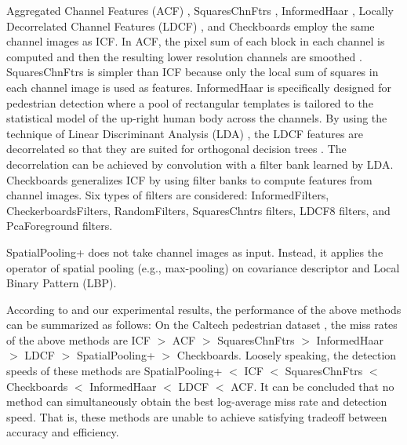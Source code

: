 \documentclass[10pt,twocolumn,letterpaper]{article}
\begin{document}
Aggregated Channel Features (ACF) \cite{Dollar_ACF_PAMI_2014}, SquaresChnFtrs \cite{Benenson_SquareChns_CVPR_2013}, InformedHaar \cite{Zhang_Info.Haar_CVPR_2014}, Locally Decorrelated 
Channel Features (LDCF) \cite{Nam_LDCF_NIPS_2014}, and Checkboards \cite{Zhang_FCF_CVPR_2015} employ the same channel images as ICF. In ACF, 
the pixel sum of each block in each channel is computed and then 
the resulting lower resolution channels are smoothed \cite{Dollar_ACF_PAMI_2014,Dollar_FastestWest_BMVC_2010}. SquaresChnFtrs \cite{Benenson_SquareChns_CVPR_2013} is simpler 
than ICF because only the local sum of squares in each channel image is used as 
features. InformedHaar \cite{Zhang_Info.Haar_CVPR_2014} is specifically 
designed for pedestrian detection where a pool of rectangular templates is 
tailored to the statistical model of the up-right human body across the 
channels. By using the technique of Linear Discriminant Analysis (LDA) \cite{Hariharan_DDCC_ECCV_2012}, the LDCF 
features are decorrelated so that they are suited for orthogonal decision 
trees \cite{Nam_LDCF_NIPS_2014}. The decorrelation can be achieved by convolution with a filter 
bank learned by LDA. Checkboards \cite{Zhang_FCF_CVPR_2015} generalizes ICF by using filter banks to compute 
features from channel images. Six types of filters are 
considered: InformedFilters, CheckerboardsFilters, RandomFilters, 
SquaresChntrs filters, LDCF8 filters, and PcaForeground filters. 

SpatialPooling+ \cite{Paisitkriangkrai_SpatialPool_arXiv_2014,Paisitkriangkrai_SpatialPool_ECCV_2014} does not take channel images as input. Instead, it applies 
the operator of spatial pooling (e.g., max-pooling) on covariance descriptor 
and Local Binary Pattern (LBP). 

According to \cite{Benenson_TenYears_ECCV_2014} and our experimental results, the performance of the above 
methods can be summarized as follows: On the Caltech pedestrian dataset 
\cite{Caltech,Dollar_PD_PAMI_2012}, the miss rates of the above 
methods are ICF $>$ ACF $>$ SquaresChnFtrs $>$ InformedHaar $>$ LDCF $>$ SpatialPooling+ $>$ 
Checkboards. Loosely speaking, the detection speeds of these 
methods are SpatialPooling+ $<$ ICF $<$ SquaresChnFtrs $<$ Checkboards $<$ InformedHaar $<$ LDCF $<$ 
ACF. It can be concluded that no method can simultaneously obtain the best 
log-average miss rate and detection speed. That is, these methods are unable 
to achieve satisfying tradeoff between accuracy and efficiency. 
\end{document}
